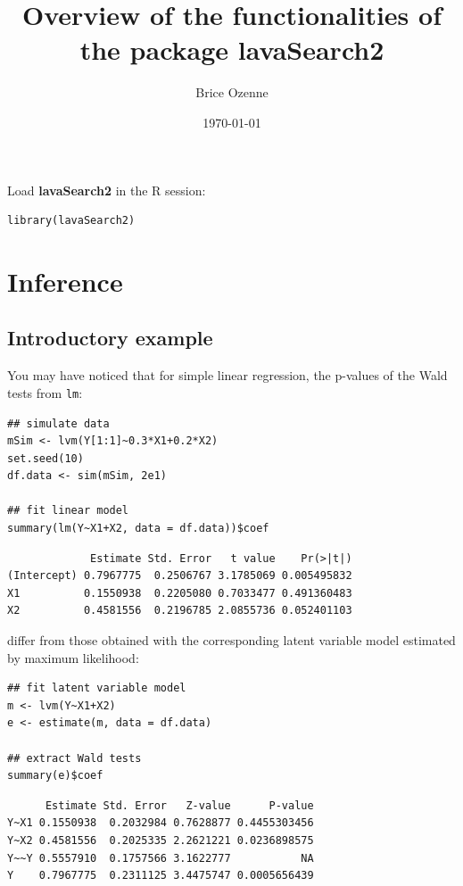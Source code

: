 \documentclass[12pt]{article}
\author{Brice Ozenne}
\date{\today}
\title{Overview of the functionalities of the package lavaSearch2}
\begin{document}
\maketitle
Load \textbf{lavaSearch2} in the R session:
\lstset{language=r,label= ,caption= ,captionpos=b,numbers=none}
\begin{lstlisting}
library(lavaSearch2)
\end{lstlisting}

\section{Inference}
\label{sec:orgb046af1}
\subsection{Introductory example}
\label{sec:org0d7082d}
You may have noticed that for simple linear regression, the p-values
of the Wald tests from \texttt{lm}:
\lstset{language=r,label= ,caption= ,captionpos=b,numbers=none}
\begin{lstlisting}
## simulate data
mSim <- lvm(Y[1:1]~0.3*X1+0.2*X2)
set.seed(10)
df.data <- sim(mSim, 2e1)

## fit linear model
summary(lm(Y~X1+X2, data = df.data))$coef
\end{lstlisting}

\begin{verbatim}
             Estimate Std. Error   t value    Pr(>|t|)
(Intercept) 0.7967775  0.2506767 3.1785069 0.005495832
X1          0.1550938  0.2205080 0.7033477 0.491360483
X2          0.4581556  0.2196785 2.0855736 0.052401103
\end{verbatim}


differ from those obtained with the corresponding latent variable
model estimated by maximum likelihood:
\lstset{language=r,label= ,caption= ,captionpos=b,numbers=none}
\begin{lstlisting}
## fit latent variable model
m <- lvm(Y~X1+X2)
e <- estimate(m, data = df.data)

## extract Wald tests
summary(e)$coef
\end{lstlisting}

\begin{verbatim}
      Estimate Std. Error   Z-value      P-value
Y~X1 0.1550938  0.2032984 0.7628877 0.4455303456
Y~X2 0.4581556  0.2025335 2.2621221 0.0236898575
Y~~Y 0.5557910  0.1757566 3.1622777           NA
Y    0.7967775  0.2311125 3.4475747 0.0005656439
\end{verbatim}
\end{document}
